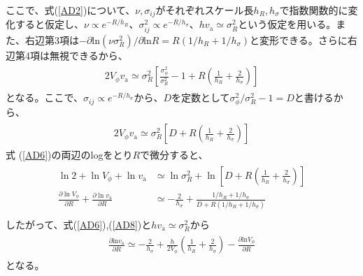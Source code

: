 ここで、式(\ref{AD2})について、$\nu,\sigma_{ij}$がそれぞれスケール長$h_R,h_{\sigma}$で指数関数的に変化すると仮定し、$\nu \propto e^{
-R/h_R}、\sigma_{ij}^2 \propto e^{-R/h_{\sigma}}、hv_{\mathrm{a}} \simeq \sigma_{R}^2$という仮定を用いる。また、右辺第3項は$-\partial \mathrm{ln}(\nu \sigma_R^2)/\partial \mathrm{ln} R = R(1/h_R + 1/h_{\sigma})$と変形できる。さらに右辺第4項は無視できるから、
\begin{align}
\begin{aligned}
    2V_{\phi}v_{\mathrm{a}} \simeq \sigma_R^2 \left[\frac{\sigma_{\phi}^2}{\sigma_R^2} - 1 + R\left(\frac{1}{h_R} + \frac{2}{h_{\sigma}}\right)\right]
\end{aligned} \label{AD5}
\end{align}
となる。ここで、$\sigma_{ij} \propto e^{-R/h_{\sigma}}$から、$D$を定数として$\sigma_{\phi}^2/\sigma_R^2 - 1 = D$と書けるから、
\begin{align}
\begin{aligned}
    2V_{\phi}v_{\mathrm{a}} \simeq \sigma_R^2 \left[D + R\left(\frac{1}{h_R} + \frac{2}{h_{\sigma}}\right)\right]
\end{aligned} \label{AD6}
\end{align}
式 (\ref{AD6})の両辺のlogをとり$R$で微分すると、
\begin{align}
\begin{aligned}
    \ln2+\ln V_{\phi}+\ln v_{\mathrm{a}} &\simeq \ln \sigma_R^2 +\ln \left[D + R\left(\frac{1}{h_R} + \frac{2}{h_{\sigma}}\right)\right] \\
    \frac{\partial \ln V_{\phi}}{\partial R}+\frac{\partial \ln v_{\mathrm{a}}}{\partial R} &\simeq -\frac{2}{h_{\sigma}} + \frac{1/h_R + 1/h_{\sigma}}{D +R\left(1/h_R + 1/h_{\sigma}\right)} \\
\end{aligned} \label{AD8}
\end{align}
したがって、式(\ref{AD6}),(\ref{AD8})と$hv_{\mathrm{a}} \simeq \sigma_R^2$から
\begin{align}
\begin{aligned}
    \frac{\partial \mathrm{ln}v_{\mathrm{a}}}{\partial R} \simeq -\frac{2}{h_{\sigma}} + \frac{h}{2V_{\phi}}\left(\frac{1}{h_R} + \frac{2}{h_{\sigma}}\right) - \frac{\partial \mathrm{ln}V_{\phi}}{\partial R}
\end{aligned} \label{AD9}
\end{align}
となる。

